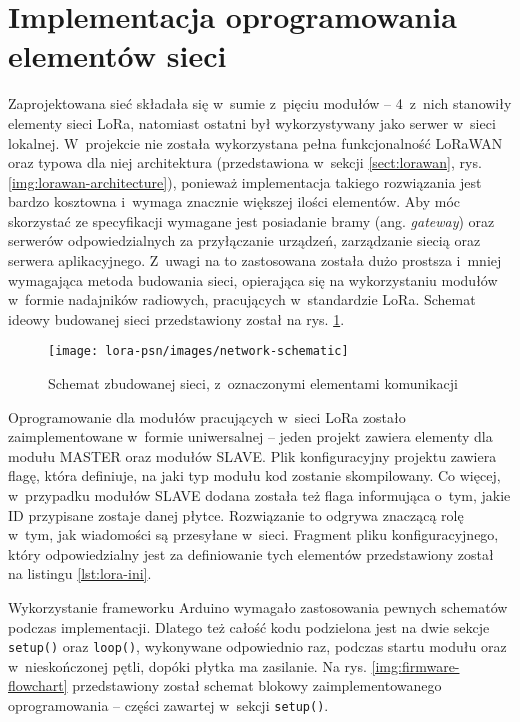 \FloatBarrier
\section{Implementacja oprogramowania elementów sieci\label{sect:firmware-network}} Zaprojektowana sieć składała się
w~sumie z~pięciu modułów -- 4~z~nich stanowiły elementy sieci LoRa, natomiast ostatni był wykorzystywany jako serwer
w~sieci lokalnej. W~projekcie nie została wykorzystana pełna funkcjonalność LoRaWAN oraz typowa dla niej architektura
(przedstawiona w~sekcji \ref{sect:lorawan}, rys. \ref{img:lorawan-architecture}), ponieważ implementacja takiego
rozwiązania jest bardzo kosztowna i~wymaga znacznie większej ilości elementów. Aby móc skorzystać ze specyfikacji
wymagane jest posiadanie bramy (ang. \textsl{gateway}) oraz serwerów odpowiedzialnych za przyłączanie urządzeń,
zarządzanie siecią oraz serwera aplikacyjnego. Z~uwagi na to zastosowana została dużo prostsza i~mniej wymagająca metoda
budowania sieci, opierająca się na wykorzystaniu modułów w~formie nadajników radiowych, pracujących w~standardzie LoRa.
Schemat ideowy budowanej sieci przedstawiony został na rys. \ref{img:network-schematic}.

\begin{figure}[!htbp]
    \centering
    \texttt{[image: lora-psn/images/network-schematic]}
    \caption{\label{img:network-schematic}Schemat zbudowanej sieci, z~oznaczonymi elementami komunikacji}
\end{figure}

Oprogramowanie dla modułów pracujących w~sieci LoRa zostało zaimplementowane w~formie uniwersalnej -- jeden projekt
zawiera elementy dla modułu MASTER oraz modułów SLAVE. Plik konfiguracyjny projektu zawiera flagę, która definiuje, na
jaki typ modułu kod zostanie skompilowany. Co więcej, w~przypadku modułów SLAVE dodana została też flaga informująca
o~tym, jakie ID przypisane zostaje danej płytce. Rozwiązanie to odgrywa znaczącą rolę w~tym, jak wiadomości są
przesyłane w~sieci. Fragment pliku konfiguracyjnego, który odpowiedzialny jest za definiowanie tych elementów
przedstawiony został na listingu \ref{lst:lora-ini}.



Wykorzystanie frameworku Arduino wymagało zastosowania pewnych schematów podczas implementacji. Dlatego też całość kodu
podzielona jest na dwie sekcje \texttt{setup()} oraz \texttt{loop()}, wykonywane odpowiednio raz, podczas startu modułu
oraz w~nieskończonej pętli, dopóki płytka ma zasilanie. Na rys. \ref{img:firmware-flowchart} przedstawiony został
schemat blokowy zaimplementowanego oprogramowania -- części zawartej w~sekcji \texttt{setup()}.

